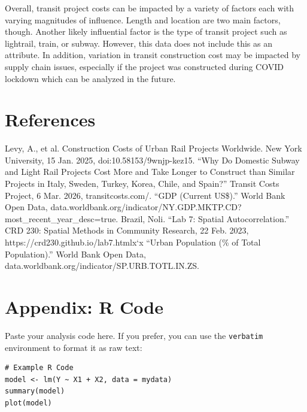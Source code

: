 \documentclass[12pt]{article}
\begin{document}
Overall, transit project costs can be impacted by a variety of factors each with varying magnitudes of influence. Length and location are two main factors, though. Another likely influential factor is the type of transit project such as lightrail, train, or subway. However, this data does not include this as an attribute. In addition, variation in transit construction cost may be impacted by supply chain issues, especially if the project was constructed during COVID lockdown which can be analyzed in the future.


\section*{References}

Levy, A., et al. Construction Costs of Urban Rail Projects Worldwide. New York University, 15 Jan. 2025, doi:10.58153/9wnjp-kez15.
\vspace{6pt}
“Why Do Domestic Subway and Light Rail Projects Cost More and Take Longer to Construct than Similar Projects in Italy, Sweden, Turkey, Korea, Chile, and Spain?” Transit Costs Project, 6 Mar. 2026, transitcosts.com/.
\vspace{6pt}
“GDP (Current US\$).” World Bank Open Data, data.worldbank.org/indicator/NY.GDP.MKTP.CD?most\_recent\_year\_desc=true.
\vspace{6pt}
Brazil, Noli. “Lab 7: Spatial Autocorrelation.” CRD 230: Spatial Methods in Community Research, 22 Feb. 2023, https://crd230.github.io/lab7.htmlx`x
\vspace{6pt}
“Urban Population (\% of Total Population).” World Bank Open Data, data.worldbank.org/indicator/SP.URB.TOTL.IN.ZS.

\newpage
\appendix
\section{Appendix: R Code}
Paste your analysis code here. If you prefer, you can use the \texttt{verbatim} environment to format it as raw text:

\begin{verbatim}
# Example R Code
model <- lm(Y ~ X1 + X2, data = mydata)
summary(model)
plot(model)
\end{verbatim}
\end{document}
